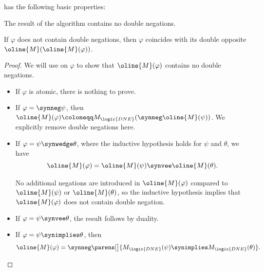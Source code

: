 \begin{proposition}\label{thm:alg:propositional_formula_dualization}
   has the following basic properties:
  \begin{thmenum}
     The result of the algorithm contains no double negations.

     If \( \varphi \) does not contain double negations, then \( \varphi \) coincides with its double opposite \( \oline{M}(\oline{M}(\varphi)) \).
   \end{thmenum}
\end{proposition}
\begin{proof}
   We will use  on \( \varphi \) to show that \( \oline{M}(\varphi) \) contains no double negations.

  \begin{itemize}
    \item If \( \varphi \) is atomic, there is nothing to prove.
    \item If \( \varphi = \synneg \psi \), then \( \oline{M}(\varphi) \coloneqq M_{\logic{DNE}}(\synneg \oline{M}(\psi)) \). We explicitly remove double negations here.

    \item If \( \varphi = \psi \synwedge \theta \), where the inductive hypothesis holds for \( \psi \) and \( \theta \), we have
    \begin{equation*}
      \oline{M}(\varphi) = \oline{M}(\psi) \synvee \oline{M}(\theta).
    \end{equation*}

    No additional negations are introduced in \( \oline{M}(\varphi) \) compared to \( \oline{M}(\psi) \) or \( \oline{M}(\theta) \), so the inductive hypothesis implies that \( \oline{M}(\varphi) \) does not contain double negation.

    \item If \( \varphi = \psi \synvee \theta \), the result follows by duality.
    \item If \( \varphi = \psi \synimplies \theta \), then
    \begin{equation*}
      \oline{M}(\varphi) = \synneg \parens[\big]{ M_{\logic{DNE}}(\psi) \synimplies M_{\logic{DNE}}(\theta) }.
    \end{equation*}


\end{itemize}
\end{proof}
